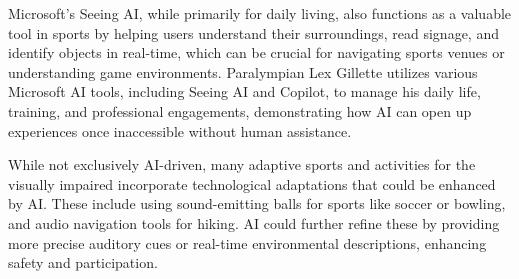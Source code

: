 Microsoft's Seeing AI, while primarily for daily living, also functions as a valuable tool in sports by helping users understand their surroundings, read signage, and identify objects in real-time, which can be crucial for navigating sports venues or understanding game environments. \cite{lexgillette2024} Paralympian Lex Gillette utilizes various Microsoft AI tools, including Seeing AI and Copilot, to manage his daily life, training, and professional engagements, demonstrating how AI can open up experiences once inaccessible without human assistance. \cite{lexgillette2024}

While not exclusively AI-driven, many adaptive sports and activities for the visually impaired incorporate technological adaptations that could be enhanced by AI. These include using sound-emitting balls for sports like soccer or bowling, and audio navigation tools for hiking. AI could further refine these by providing more precise auditory cues or real-time environmental descriptions, enhancing safety and participation. \cite{brightfocus2024, hable2025}

